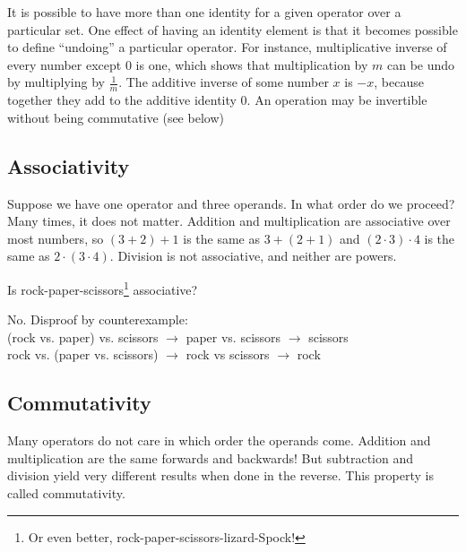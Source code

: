 It is possible to have more than one identity for a given operator over a particular set.  
One effect of having an
identity element is that it becomes possible to define ``undoing'' a particular operator.  For instance,
multiplicative inverse of every number except 0 is one, which shows that multiplication by $m$ can be
undo by multiplying by $\frac{1}{m}$.  The additive inverse of some number $x$ is $-x$, because together
they add to the additive identity 0.  An operation may be invertible without being commutative (see below)

\subsection{Associativity}
Suppose we have one operator and three operands.  In what order do we proceed?  Many times,
it does not matter.  Addition and multiplication are associative over most numbers, so $(3+2)+1$ 
is the same as $3+(2+1)$ and $(2\cdot 3) \cdot 4$ is the same as $2\cdot(3\cdot 4)$.  Division is
not associative, and neither are powers.




\begin{example}
\exProblem
Is rock-paper-scissors\footnote{Or even better, rock-paper-scissors-lizard-Spock!} associative?

\exSolution
No.  Disproof by counterexample:\\
(rock vs. paper) vs. scissors $\rightarrow$ paper vs. scissors $\rightarrow$ scissors\\
rock vs. (paper vs. scissors) $\rightarrow$ rock vs scissors $\rightarrow$ rock
\end{example}

\subsection{Commutativity}
Many operators do not care in which order the operands come.  Addition and multiplication are the same
forwards and backwards!  But subtraction and division yield very different results when done in the
reverse.  This property is called commutativity.

